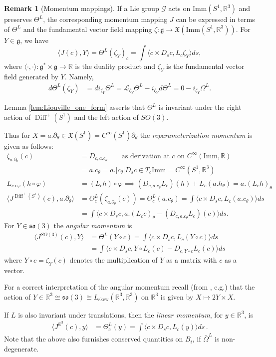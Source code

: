 \documentclass[12pt]{amsart}
\newcommand{\rev}[1]{#1}
\theoremstyle{definition}
\newtheorem{remark}[theorem]{Remark}
\newcommand{\R}{\mathbb R}
\newcommand{\Diffp}{\operatorname{Diff}^+(S^1)}
\newcommand{\Imm}{\mathrm{Imm}}
\def\ze{\zeta}
\def\th{\theta}
\def\ph{\varphi}
\def\Th{\Theta}
\def\Om{\Omega}
\def\o{\operatorname{\circ}}
\def\x{\times}
\def\p{\partial}
\def\X{{\mathfrak X}}
\def\R{{\mathbb R}}
\begin{document}
\begin{remark}[Momentum mappings]\label{rem:momentum_general}
If a Lie group $\mathcal G$ acts on $\Imm(S^1,\R^3)$ and  preserves $\Th^L$,
 the corresponding momentum mapping $J$ can be expressed in terms of $\Th^L$ and the fundamental vector field mapping $\ze:\mathfrak g \to \X(\Imm(S^1,\mathbb R^3))$. For $Y\in \mathfrak g$, we have
\begin{equation*}
    \langle J(c),Y\rangle = \Th^L(\ze_Y)_c = \int \langle c\x D_sc, L_c\zeta_Y\rangle ds,
\end{equation*}
where $\langle\cdot,\cdot\rangle: \mathfrak g^* \x \mathfrak g\to \mathbb R$ is \rev{the duality product and $\zeta_Y$ is the fundamental vector field generated by $Y$}.
Namely,
\begin{align*}
    d \Th^L(\ze_Y) &= d i_{\ze_Y} \Th^L = \mathcal{L}_{\ze_Y} \Th^L -  i_{\ze_Y} d\Th^L = 0 - i_{\ze_Y} \Om^L.
\end{align*}

Lemma \ref{lem:Liouville_one_form} asserts that $\Th^L$ is invariant under the right action of $\Diffp$ and the left action of $SO(3)$.

Thus for $X=a.\p_\th\in \X(S^1)= C^\infty(S^1)\p_\th$  the \emph{reparameterization momentum} is given as follows:
\begin{align}
\ze_{a.\p_\th}(c) &= D_{c,a.c_\th} \qquad\text{as derivation at $c$ on }
C^\infty(\Imm, \mathbb R) 
\\&
= a. c_\th = a.|c_\th| D_s c \in T_c\Imm = C^\infty(S^1,\mathbb R^3)
\\
L_{c\o \ph}(h\o \ph) &= (L_ch)\o \ph \implies 
(D_{c,a.c_\th} L_c)(h) + L_c(a.h_\th) = a.(L_ch)_\th
\\
  \langle J^{\Diffp}(c), a.\p_\th\rangle &= \Th^L_c(\ze_{a.\p_\th}(c)) = \Th^L_c (a.c_\th) = 
  \int \langle c\x D_sc, L_c(a.c_\th)\rangle ds
  \\&
  = \int \langle c\x D_sc, a.(L_cc)_\th - (D_{c,a.c_\th} L_c)(c)\rangle ds.
 \end{align}
 For $Y\in \mathfrak {so}(3)$ the \emph{angular momentum} is  
 \begin{align}
 \langle J^{SO(3)}(c), Y\rangle &= \Th^L(Y\o c) = \int \langle c\x D_sc, L_c(Y\o c)\rangle ds 
 \\&
 = \int \langle c\x D_sc, \rev{Y}\o L_c(c) 
 - D_{c,Y\o c}L_c(c)
 \rangle ds
\end{align}
\rev{where $Y \circ c=\zeta_Y(c)$ denotes the multiplication of $Y$ as a matrix with $c$ as a vector.
}
For a correct interpretation of the angular momentum recall (from  \cite[4.31]{Michor08}, e.g.) that the action of  $Y\in \mathbb R^3 \cong \mathfrak{so}(3)\cong L_{\text{skew}}(\mathbb R^3,\mathbb R^3)$ on $\mathbb R^3$ is given by $X\mapsto 2Y\x X$.


If $L$ is also invariant under translations, then the \emph{linear momentum}, for $y\in \mathbb R^3$, is 
\begin{align}
\langle J^{\mathbb R^3}(c), y\rangle &= \Th^L_c(y) = \int \langle c\x D_sc, L_c(y)\rangle ds\,.    
\end{align}
Note that the above also furnishes conserved quantities on $B_i$, if $\bar\Om^L$ is non-degenerate.
\end{remark}
\end{document}
